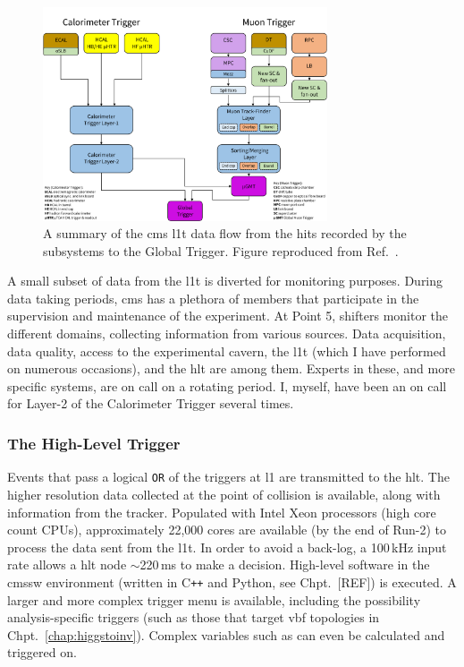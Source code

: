 \begin{figure}[htbp]
    \centering
    \includegraphics[width=0.75\textwidth]{figures/CMS_L1T_data_flow_key_ordered.pdf}
    \caption[A summary of the CMS Level-1 Trigger data flow from the hits recorded by the subsystems to the Global Trigger]{A summary of the \acrshort{cms} \acrlong{l1t} data flow from the hits recorded by the subsystems to the Global Trigger. Figure reproduced from Ref.~.}
    \label{fig:cms_l1t_data_flow}
\end{figure}

A small subset of data from the \acrshort{l1t} is diverted for monitoring purposes. During data taking periods, \acrshort{cms} has a plethora of members that participate in the supervision and maintenance of the experiment. At Point 5, shifters monitor the different domains, collecting information from various sources. Data acquisition, data quality, access to the experimental cavern, the \acrshort{l1t} (which I have performed on numerous occasions), and the \acrshort{hlt} are among them. Experts in these, and more specific systems, are on call on a rotating period. I, myself, have been an on call for Layer-2 of the Calorimeter Trigger several times.




\subsubsection{The High-Level Trigger}
\label{subsubsec:detector_hlt}

Events that pass a logical \texttt{OR} of the triggers at \acrlong{l1} are transmitted to the \acrshort{hlt}. The higher resolution data collected at the point of collision is available, along with information from the tracker. Populated with Intel Xeon processors (high core count CPUs), approximately 22,000 cores are available (by the end of Run-2) to process the data sent from the \acrshort{l1t}. In order to avoid a back-log, a 100\,kHz input rate allows a \acrshort{hlt} node $\sim$220\,ms to make a decision. High-level software in the \acrshort{cmssw} environment (written in C\texttt{++} and Python, see Chpt.~[REF]) %
is executed. A larger and more complex trigger menu is available, including the possibility analysis-specific triggers (such as those that target \acrshort{vbf} topologies in Chpt.~\ref{chap:higgstoinv}). Complex variables such as \alphaT can even be calculated and triggered on.

